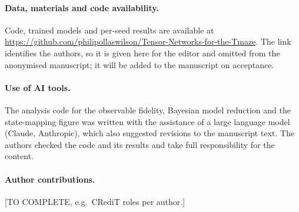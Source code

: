 \documentclass[11pt]{article}
\begin{document}
\paragraph{Data, materials and code availability.} Code, trained models and per-seed results are available at \url{https://github.com/philipollaswilson/Tensor-Networks-for-the-Tmaze}. The link identifies the authors, so it is given here for the editor and omitted from the anonymised manuscript; it will be added to the manuscript on acceptance.

\paragraph{Use of AI tools.} The analysis code for the observable fidelity, Bayesian model reduction and the state-mapping figure was written with the assistance of a large language model (Claude, Anthropic), which also suggested revisions to the manuscript text. The authors checked the code and its results and take full responsibility for the content.

\paragraph{Author contributions.} [TO COMPLETE, e.g.\ CRediT roles per author.]
\end{document}
